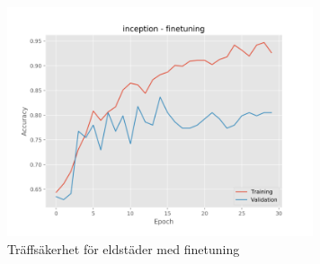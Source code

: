 \documentclass[]{kththesis}
\begin{document}
\begin{figure}[h]
    \includegraphics[width=9cm]{f_a_inception_fine}
    \caption{Träffsäkerhet för eldstäder med finetuning}
    \label{fig:f_a_2}
  \end{figure}
  
\end{document}
